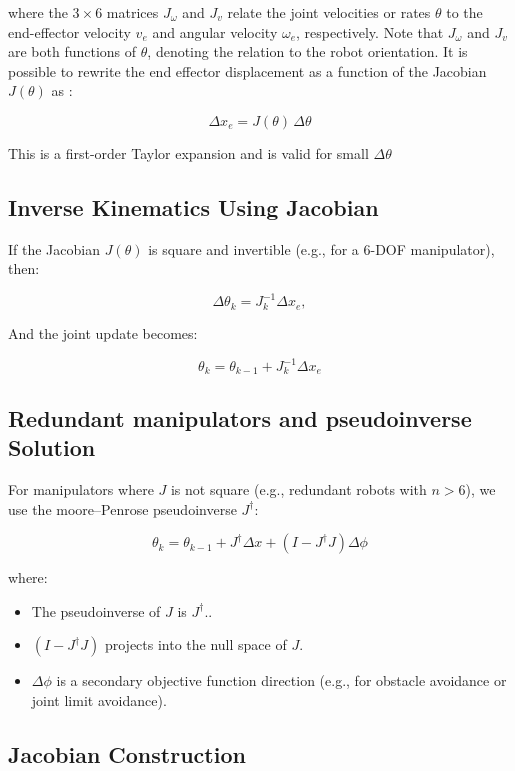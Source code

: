 \documentclass[12pt]{article}
\begin{document}
where the $3\times6$ matrices $J_\omega$ and $J_v$ relate the joint velocities or rates $\theta$ to the end-effector velocity $v_e$ and angular velocity $\omega_e$, respectively. Note that $J_\omega$ and $J_v$ are both functions of $\theta$, denoting the relation to the robot orientation. It is possible to rewrite the end effector displacement as a function of the Jacobian $J(\theta)$ as \cite{ref19}:

  \[
    \Delta x_e = J(\theta) \, \Delta \theta 
  \]

This is a first-order Taylor expansion and is valid for small $\Delta \theta$
\newpage
\subsection{Inverse Kinematics Using Jacobian}

If the Jacobian $J(\theta)$ is square and invertible (e.g., for a 6-DOF manipulator), then:\cite{ref19}

  \[
    \Delta \theta_k = J_k^{-1} \Delta x_e ,
  \]

And the joint update becomes:

  \[
    \theta_k = \theta_{k-1} + J_k^{-1} \Delta x_e  
  \]

\subsection{Redundant manipulators and pseudoinverse Solution}

For manipulators where $J$ is not square (e.g., redundant robots with $n > 6$), we use the moore–Penrose pseudoinverse $J^\dagger$:\cite{ref19}

  \[
    \theta_k = \theta_{k-1} + J^\dagger \Delta x + (I - J^\dagger J)\Delta \phi 
  \]

where:
\begin{itemize}
    \item The pseudoinverse of $J$ is $J^\dagger$.\cite{ref19}. 
    \item $(I - J^\dagger J)$ projects into the null space of $J$\cite{ref19}.
    \item $\Delta \phi$ is a secondary objective function direction (e.g., for obstacle avoidance or joint limit avoidance)\cite{ref19}.
\end{itemize}

\subsection{Jacobian Construction}
\end{document}
